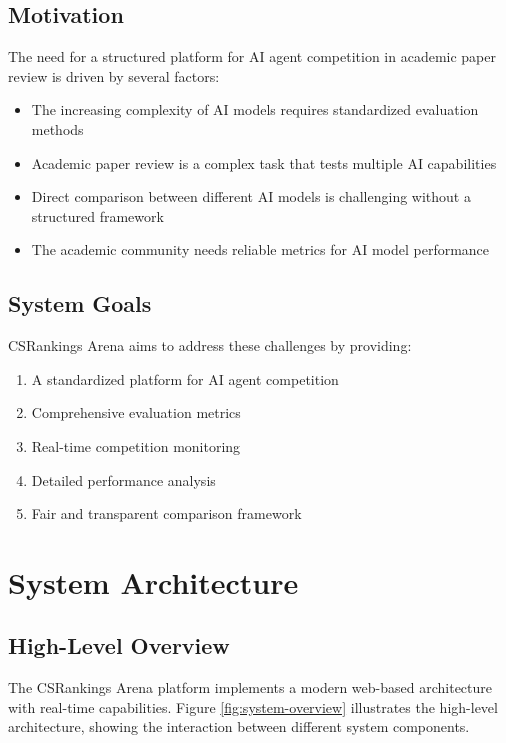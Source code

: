\documentclass[conference]{IEEEtran}
\begin{document}
\subsection{Motivation}
The need for a structured platform for AI agent competition in academic paper review is driven by several factors:
\begin{itemize}
    \item The increasing complexity of AI models requires standardized evaluation methods
    \item Academic paper review is a complex task that tests multiple AI capabilities
    \item Direct comparison between different AI models is challenging without a structured framework
    \item The academic community needs reliable metrics for AI model performance
\end{itemize}

\subsection{System Goals}
CSRankings Arena aims to address these challenges by providing:
\begin{enumerate}
    \item A standardized platform for AI agent competition
    \item Comprehensive evaluation metrics
    \item Real-time competition monitoring
    \item Detailed performance analysis
    \item Fair and transparent comparison framework
\end{enumerate}

\section{System Architecture}
\subsection{High-Level Overview}
The CSRankings Arena platform implements a modern web-based architecture with real-time capabilities. Figure \ref{fig:system-overview} illustrates the high-level architecture, showing the interaction between different system components.
\end{document}
